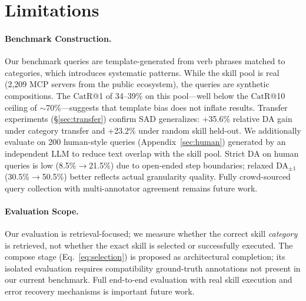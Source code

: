 \documentclass[11pt]{article}
\newcommand{\catrecall}{\text{CatR}}
\begin{document}


\section*{Limitations}

\paragraph{Benchmark Construction.}
Our benchmark queries are template-generated from verb phrases matched to categories, which introduces systematic patterns.
While the skill pool is real (2{,}209 MCP servers from the public ecosystem), the queries are synthetic compositions.
The $\catrecall$@1 of 34--39\% on this pool---well below the $\catrecall$@10 ceiling of $\sim$70\%---suggests that template bias does not inflate results.
Transfer experiments (\S\ref{sec:transfer}) confirm SAD generalizes: +35.6\% relative DA gain under category transfer and +23.2\% under random skill held-out.
We additionally evaluate on 200 human-style queries (Appendix~\ref{sec:human}) generated by an independent LLM to reduce text overlap with the skill pool.
Strict DA on human queries is low (8.5\%$\to$21.5\%) due to open-ended step boundaries; relaxed DA$_{\pm 1}$ (30.5\%$\to$50.5\%) better reflects actual granularity quality.
Fully crowd-sourced query collection with multi-annotator agreement remains future work.

\paragraph{Evaluation Scope.}
Our evaluation is retrieval-focused; we measure whether the correct skill \emph{category} is retrieved, not whether the exact skill is selected or successfully executed.
The compose stage (Eq.~\ref{eq:selection}) is proposed as architectural completion; its isolated evaluation requires compatibility ground-truth annotations not present in our current benchmark.
Full end-to-end evaluation with real skill execution and error recovery mechanisms is important future work.
\end{document}
